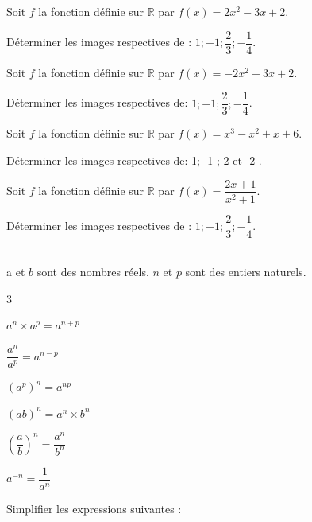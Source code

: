 \documentclass[10pt,a4paper]{article}  %
\begin{document}
\begin{enumMet}
  \item Soit $f$ la fonction définie sur $\mathbb{R}$ par $f(x)=2 x^{2}-3 x+2$.
  
  Déterminer les images respectives de : $1 ;-1 ; \dfrac{2}{3} ;-\dfrac{1}{4}$.
  \item Soit $f$ la fonction définie sur $\mathbb{R}$ par $f(x)=-2 x^{2}+3 x+2$.
  
  Déterminer les images respectives de: $1 ;-1 ; \dfrac{2}{3} ;-\dfrac{1}{4}$.
  \item Soit $f$ la fonction définie sur $\mathbb{R}$ par $f(x)=x^{3}-x^{2}+x+6$.
  
  Déterminer les images respectives de: 1; -1 ; 2 et -2 .\\
  \item Soit $f$ la fonction définie sur $\mathbb{R}$ par $f(x)=\dfrac{2 x+1}{x^{2}+1}$.
  
  Déterminer les images respectives de : $1 ;-1 ; \dfrac{2}{3} ;-\dfrac{1}{4}$.
\end{enumMet}
\vspace*{-0.8cm}
\exerciceDS{}

\begin{brappel}
	\\
	a et $b$ sont des nombres réels. $n$ et $p$ sont des entiers naturels.
	\begin{multicols}{3}
		\begin{itemMet}
		\item $a^{n} \times a^{p}=a^{n+p}$
		\item $\dfrac{a^{n}}{a^{p}}=a^{n-p}$
		\item $\left(a^{p}\right)^{n}=a^{n p}$
		\item $(a b)^{n}=a^{n} \times b^{n}$
		\item $\left(\dfrac{a}{b}\right)^{n}=\dfrac{a^{n}}{b^{n}}$
		\item $a^{-n}=\dfrac{1}{a^{n}}$
	\end{itemMet}
	\end{multicols}
\end{brappel}	


Simplifier les expressions suivantes :
\end{document}
